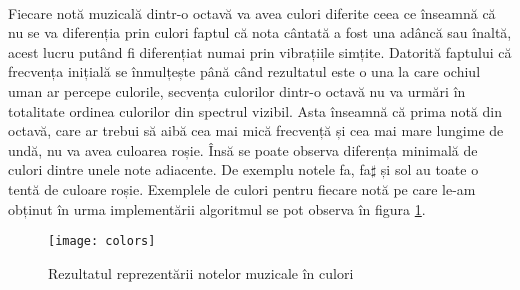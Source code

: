 \documentclass[../IoMusT.tex]{subfiles}
\begin{document}
\\
\par Fiecare notă muzicală dintr-o octavă va avea culori diferite ceea ce în\-seam\-nă că nu se va diferenția prin culori faptul că nota cântată a fost una adâncă sau înaltă, acest lucru putând fi diferențiat numai prin vibrațiile simțite. Datorită faptului că frecvența inițială se înmulțește până când rezultatul este o una la care ochiul uman ar percepe culorile, secvența culorilor dintr-o octavă nu va urmări în totalitate ordinea culorilor din spectrul vizibil. Asta înseamnă că prima notă din octavă, care ar trebui să aibă cea mai mică frecvență și cea mai mare lungime de undă, nu va avea culoarea roșie. Însă se poate observa diferența minimală de culori dintre unele note adiacente. De exemplu notele fa, fa$\sharp$ și sol au toate o tentă de culoare roșie. Exemplele de culori pentru fiecare notă pe care le-am obținut în urma implementării algoritmul se pot observa în figura \ref{fig:colors}.
\begin{figure}[h]
\centering
\texttt{[image: colors]}
\caption{Rezultatul reprezentării notelor muzicale în culori}
\label{fig:colors}
\end{figure} 
\end{document}
